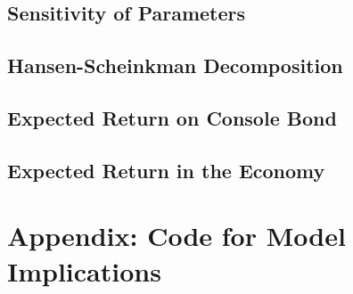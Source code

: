 \documentclass[11pt,reqno,final]{amsart}
\begin{document}
\subsection{Sensitivity of Parameters}

\subsection{Hansen-Scheinkman Decomposition}

\subsection{Expected Return on Console Bond}

\subsection{Expected Return in the Economy}

%
%
\newpage


%
%
\newpage
\section*{Appendix: Code for Model Implications}
%
\end{document}

